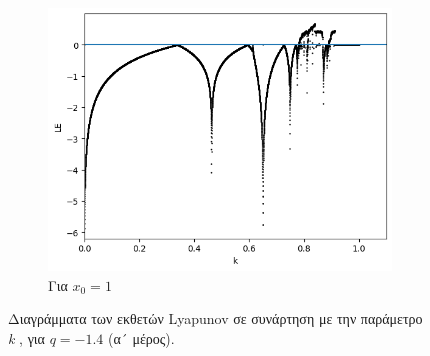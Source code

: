 \begin{figure}[ht]
\begin{subfigure}[b]{0.7\textwidth}
		\includegraphics[width=\textwidth]{LateX images/graphs q16/g9}
		\caption{Για \(x_0=1\)}
		\label{f:g35}
	\end{subfigure}

	\caption{Διαγράμματα των εκθετών Lyapunov σε συνάρτηση με την παράμετρο \emph{k} , για  $q=-1.4$ (α´ μέρος).}
\end{figure}

